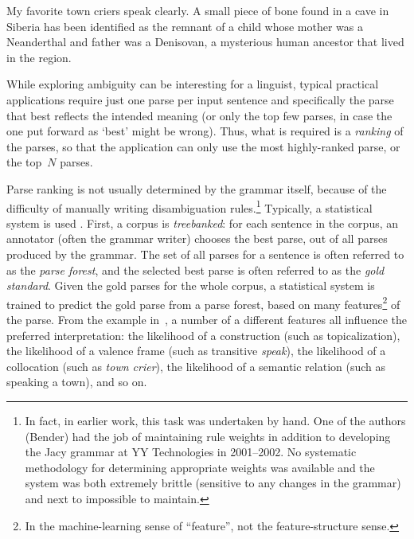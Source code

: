 \documentclass[output=paper,nonflat]{langsci/langscibook}
\begin{document}
\begin{exe}
\ex\label{cl:ex:ambig-simple}
My favorite town criers speak clearly.
\ex\label{cl:ex:ambig-many}
A small piece of bone found in a cave in Siberia has been identified
as the remnant of a child whose mother was a Neanderthal and father was a Denisovan,
a mysterious human ancestor that lived in the region.
\end{exe}

While exploring ambiguity can be interesting for a linguist,
typical practical applications require just one parse per input sentence
and specifically the parse that best reflects the intended meaning
(or only the top few parses, in case the one put forward as `best' might be wrong).
Thus, what is required is a \textit{ranking} of the parses,
so that the application can only use the most highly-ranked parse,
or the top~$N$ parses.

Parse ranking is not usually determined by the grammar itself, because
of the difficulty of manually writing disambiguation
rules.\footnote{In fact, in earlier work, this task was undertaken by
  hand. One of the authors (Bender) had the job of maintaining rule
  weights in addition to developing the Jacy grammar \cite{SBB2016a}
  at YY Technologies in 2001--2002. No systematic methodology for
  determining appropriate weights was available and the system was
  both extremely brittle (sensitive to any changes in the grammar) and
  next to impossible to maintain.}
Typically, a statistical system is used \citep{Tou:Man:Shi:Fli:Oep:02,Tou:Man:Fli:Oep:05}.
First, a corpus is \textit{treebanked}:
for each sentence in the corpus,
an annotator (often the grammar writer) chooses the best parse,
out of all parses produced by the grammar.
The set of all parses for a sentence is often referred to as the \textit{parse forest},
and the selected best parse is often referred to as the \textit{gold standard}.
Given the gold parses for the whole corpus, a statistical system is trained
to predict the gold parse from a parse forest,
based on many features\footnote{%
	In the machine-learning sense of ``feature'',
	not the feature-structure sense.
}
of the parse.
From the example in~,
a number of a different features all influence the preferred interpretation:
the likelihood of a construction (such as topicalization),
the likelihood of a valence frame (such as transitive \textit{speak}),
the likelihood of a collocation (such as \textit{town crier}),
the likelihood of a semantic relation (such as speaking a town),
and so on.
\end{document}
